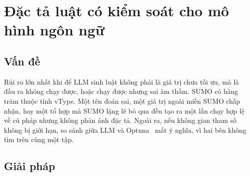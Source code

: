 \documentclass[../DoAn.tex]{subfiles}
\begin{document}
\section{Đặc tả luật có kiểm soát cho mô hình ngôn ngữ}
\label{section:5.1}

\subsection{Vấn đề}

Rủi ro lớn nhất khi để LLM sinh luật không phải là giá trị chưa tối ưu, mà là đầu ra không chạy được, hoặc chạy được nhưng sai âm thầm. SUMO có hàng trăm thuộc tính vType. Một tên đoán sai, một giá trị ngoài miền SUMO chấp nhận, hay một tổ hợp mà SUMO lặng lẽ bỏ qua đều tạo ra một lần chạy hợp lệ về cú pháp nhưng không phản ánh đặc tả. Ngoài ra, nếu không gian tham số không bị giới hạn, so sánh giữa LLM và Optuna~\cite{akiba2019optuna} mất ý nghĩa, vì hai bên không tìm trên cùng một tập.

\subsection{Giải pháp}
\end{document}
